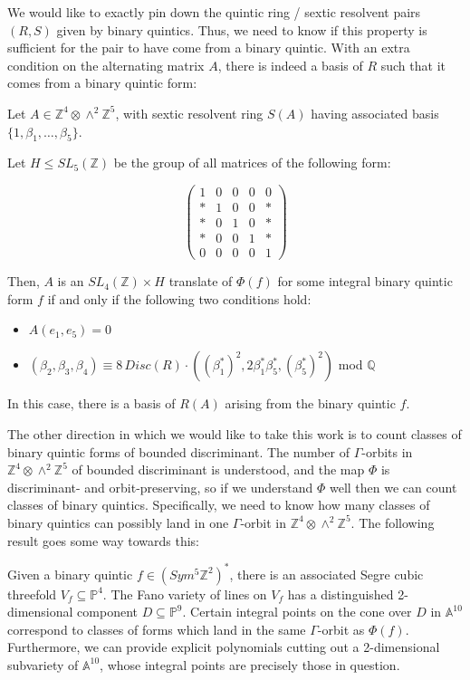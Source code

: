 \documentclass{article}
\begin{document}
We would like to exactly pin down the quintic ring / sextic resolvent pairs $(R,S)$ given by binary quintics.  Thus, we need to know if this property is sufficient for the pair to have come from a binary quintic.  With an extra condition on the alternating matrix $A$, there is indeed a basis of $R$ such that it comes from a binary quintic form:
\begin{theorem}
Let $A \in \mathbb{Z}^4 \otimes \wedge^2 \mathbb{Z}^5$, with sextic resolvent ring $S(A)$ having associated basis $\{1,\beta_1,\ldots,\beta_5\}$.

Let $H \leqslant SL_5(\mathbb{Z})$ be the group of all matrices of the following form:

\begin{equation}
\begin{pmatrix}
1 & 0 & 0 & 0 & 0 \\
* & 1 & 0 & 0 & * \\
* & 0 & 1 & 0 & * \\
* & 0 & 0 & 1 & * \\
0 & 0 & 0 & 0 & 1
\end{pmatrix}
\end{equation}

Then, $A$ is an $SL_4(\mathbb{Z}) \times H$ translate of $\Phi(f)$ for some integral binary quintic form $f$ if and only if the following two conditions hold:
\begin{itemize}
\item $A(e_1,e_5) = 0$
\item $(\beta_2, \beta_3, \beta_4) \equiv 8 \, Disc(R) \cdot ((\beta_1^*)^2, 2 \beta_1^* \beta_5^*, (\beta_5^*)^2)$ mod $\mathbb{Q}$
\end{itemize}

In this case, there is a basis of $R(A)$ arising from the binary quintic $f$.
\end{theorem}

The other direction in which we would like to take this work is to count classes of binary quintic forms of bounded discriminant.  The number of $\Gamma$-orbits in $\mathbb{Z}^4 \otimes \wedge^2 \mathbb{Z}^5$ of bounded discriminant is understood, and the map $\Phi$ is discriminant- and orbit-preserving, so if we understand $\Phi$ well then we can count classes of binary quintics.  Specifically, we need to know how many classes of binary quintics can possibly land in one $\Gamma$-orbit in $\mathbb{Z}^4 \otimes \wedge^2 \mathbb{Z}^5$.  The following result goes some way towards this:

\begin{theorem} [In Progress]
Given a binary quintic $f \in (Sym^5 \mathbb{Z}^2)^*$, there is an associated Segre cubic threefold $V_f \subseteq \mathbb{P}^4$.  The Fano variety of lines on $V_f$ has a distinguished 2-dimensional component $D \subseteq \mathbb{P}^9$.  Certain integral points on the cone over $D$ in $\mathbb{A}^{10}$ correspond to classes of forms which land in the same $\Gamma$-orbit as $\Phi(f)$.  Furthermore, we can provide explicit polynomials cutting out a 2-dimensional subvariety of $\mathbb{A}^{10}$, whose integral points are precisely those in question.
\end{theorem}
\end{document}
